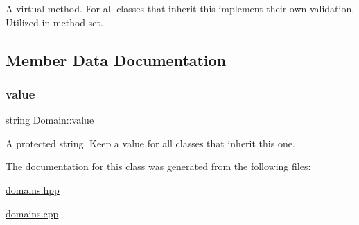A virtual method. For all classes that inherit this implement their own validation. Utilized in method set. 

\subsection{Member Data Documentation}
\mbox{\label{class_domain_a9d15a9f2c19c5863fe863a7d2f53a7cc}} 
\subsubsection{\texorpdfstring{value}{value}}
{\footnotesize\ttfamily string Domain\+::value\hspace{0.3cm}{\ttfamily [protected]}}

A protected string. Keep a value for all classes that inherit this one. 

The documentation for this class was generated from the following files\+:\begin{DoxyCompactItemize}
\item 
\hyperlink{domains_8hpp}{domains.\+hpp}\item 
\hyperlink{domains_8cpp}{domains.\+cpp}\end{DoxyCompactItemize}
